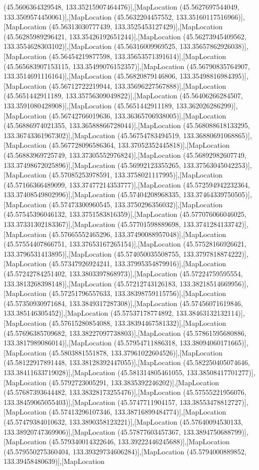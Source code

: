 (45.5606364329548, 133.35215907464476)],[MapLocation (45.5627697544049, 133.3509574450061)],[MapLocation (45.5632204457552, 133.35160117516966)],[MapLocation (45.56313030777439, 133.3525453127429)],[MapLocation (45.56285989296421, 133.35426192651244)],[MapLocation (45.56273945409562, 133.3554628303102)],[MapLocation (45.56316009969525, 133.35657862926038)],[MapLocation (45.56454219877598, 133.35653571391614)],[MapLocation (45.565683907153115, 133.35499076152357)],[MapLocation (45.56790835764907, 133.3514691116164)],[MapLocation (45.56820879146806, 133.35498816984395)],[MapLocation (45.56712722219944, 133.35696227567888)],[MapLocation (45.5651442911189, 133.35756309049822)],[MapLocation (45.56406266284507, 133.3591080428908)],[MapLocation (45.5651442911189, 133.362026286299)],[MapLocation (45.56742766019636, 133.36365706938005)],[MapLocation (45.56886974021355, 133.36588866728044)],[MapLocation (45.568088618133295, 133.36743361967302)],[MapLocation (45.56754783494519, 133.36880691068865)],[MapLocation (45.567728096586364, 133.37052352445818)],[MapLocation (45.56883969725749, 133.37305552976824)],[MapLocation (45.56892982607749, 133.37498672025896)],[MapLocation (45.56992123355265, 133.37563045042253)],[MapLocation (45.57085253978591, 133.3758021117995)],[MapLocation (45.57166366489099, 133.37477214353777)],[MapLocation (45.572594942232364, 133.37408549802996)],[MapLocation (45.57404208968335, 133.37464339750505)],[MapLocation (45.57473300960545, 133.3750296356032)],[MapLocation (45.57545396046132, 133.3751583816359)],[MapLocation (45.577076066046025, 133.37331302183367)],[MapLocation (45.57701598889698, 133.3741284133742)],[MapLocation (45.57665552465296, 133.37490088957048)],[MapLocation (45.57554407866751, 133.37653167265154)],[MapLocation (45.57528166926621, 133.3796531413895)],[MapLocation (45.574050035508755, 133.3797818874222)],[MapLocation (45.57347926924241, 133.37995354879916)],[MapLocation (45.57242784251402, 133.3803397868973)],[MapLocation (45.57224759595554, 133.3813268398148)],[MapLocation (45.57212743126183, 133.38218514669956)],[MapLocation (45.57251796557633, 133.38398759115756)],[MapLocation (45.57350930971684, 133.3849317287308)],[MapLocation (45.57456071619846, 133.385146305452)],[MapLocation (45.57537178774892, 133.38463132132114)],[MapLocation (45.57615280854088, 133.38394467581332)],[MapLocation (45.57696385709682, 133.38227097738803)],[MapLocation (45.57861595680886, 133.3817989086014)],[MapLocation (45.57954711886318, 133.38094060171665)],[MapLocation (45.5803881551878, 133.37961022604526)],[MapLocation (45.58122917891448, 133.38128392447055)],[MapLocation (45.582250405074646, 133.38411633719028)],[MapLocation (45.581314805461055, 133.38508417701277)],[MapLocation (45.5792723005291, 133.3835392246202)],[MapLocation (45.57687393644482, 133.38328173255476)],[MapLocation (45.57555221956076, 133.38459065055403)],[MapLocation (45.5747711904157, 133.38553478812727)],[MapLocation (45.57413296107346, 133.38716899484774)],[MapLocation (45.57479384010632, 133.3890358123221)],[MapLocation (45.57640094530133, 133.38920747369906)],[MapLocation (45.57877603457367, 133.3894750688799)],[MapLocation (45.579340014322646, 133.39222446245688)],[MapLocation (45.579550275360404, 133.39329734606284)],[MapLocation (45.5794000889852, 133.39458480639)],[MapLocation 